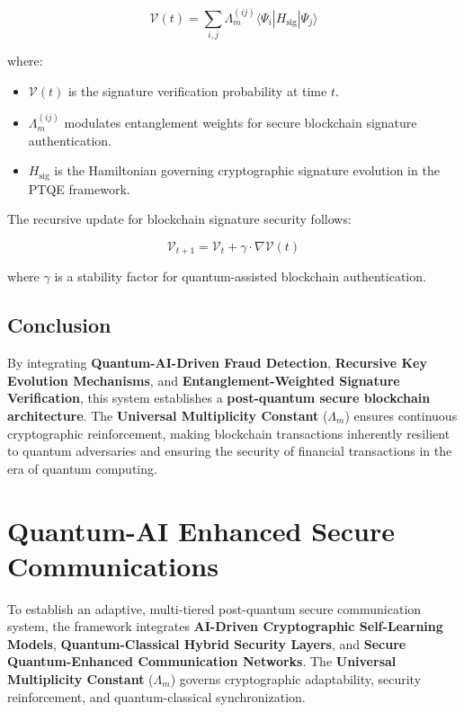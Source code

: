 \documentclass{article}
\theoremstyle{plain}
\begin{document}
\begin{equation}
    \mathcal{V}(t) = \sum_{i,j} \Lambda_m^{(ij)} \langle \Psi_i | H_{\text{sig}} | \Psi_j \rangle
\end{equation}

where:
\begin{itemize}
    \item $\mathcal{V}(t)$ is the signature verification probability at time $t$.
    \item $\Lambda_m^{(ij)}$ modulates entanglement weights for secure blockchain signature authentication.
    \item $H_{\text{sig}}$ is the Hamiltonian governing cryptographic signature evolution in the PTQE framework.
\end{itemize}

The recursive update for blockchain signature security follows:

\begin{equation}
    \mathcal{V}_{t+1} = \mathcal{V}_t + \gamma \cdot \nabla \mathcal{V}(t)
\end{equation}

where $\gamma$ is a stability factor for quantum-assisted blockchain authentication.

\subsection{Conclusion}

By integrating \textbf{Quantum-AI-Driven Fraud Detection}, \textbf{Recursive Key Evolution Mechanisms}, and \textbf{Entanglement-Weighted Signature Verification}, this system establishes a \textbf{post-quantum secure blockchain architecture}. The \textbf{Universal Multiplicity Constant} ($\Lambda_m$) ensures continuous cryptographic reinforcement, making blockchain transactions inherently resilient to quantum adversaries and ensuring the security of financial transactions in the era of quantum computing.

\section{Quantum-AI Enhanced Secure Communications}

To establish an adaptive, multi-tiered post-quantum secure communication system, the framework integrates \textbf{AI-Driven Cryptographic Self-Learning Models}, \textbf{Quantum-Classical Hybrid Security Layers}, and \textbf{Secure Quantum-Enhanced Communication Networks}. The \textbf{Universal Multiplicity Constant} ($\Lambda_m$) governs cryptographic adaptability, security reinforcement, and quantum-classical synchronization.
\end{document}
